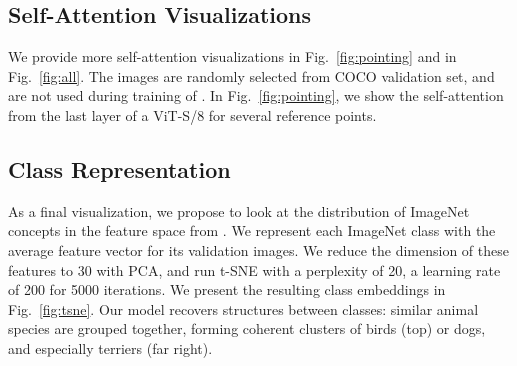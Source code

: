 \subsection{Self-Attention Visualizations}
\label{ap:visu}
We provide more self-attention visualizations in Fig.~\ref{fig:pointing} and in Fig.~\ref{fig:all}.
The images are randomly selected from COCO validation set, and are not used during training of \OURS.
In Fig.~\ref{fig:pointing}, we show the self-attention from the last layer of a \OURS ViT-S/8 for several reference points.

\subsection{Class Representation}
As a final visualization, we propose to look at the distribution of ImageNet concepts in the feature space from \OURS.
We represent each ImageNet class with the average feature vector for its validation images.
We reduce the dimension of these features to 30 with PCA, and run t-SNE with a perplexity of 20, a learning rate of 200 for 5000 iterations.
We present the resulting class embeddings in Fig.~\ref{fig:tsne}.
Our model recovers structures between classes: similar animal species are grouped together, forming coherent clusters of birds (top) or dogs, and especially terriers (far right).

